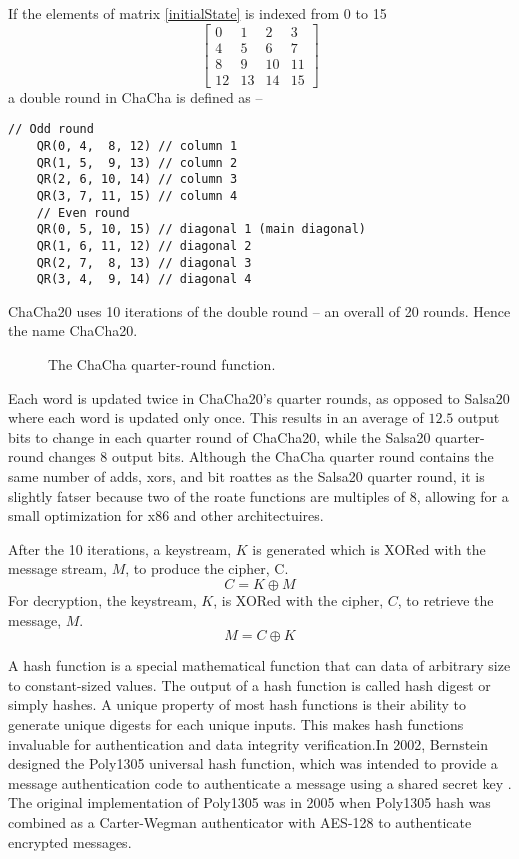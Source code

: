 \documentclass{article}
\begin{document}
If the elements of matrix \ref{initialState} is indexed from 0 to 15
\[\left[
        \begin{array}{cccc}
            0  & 1  & 2  & 3  \\
            4  & 5  & 6  & 7  \\
            8  & 9  & 10 & 11 \\
            12 & 13 & 14 & 15
        \end{array}
        \right]\]
a double round in ChaCha is defined as --
\begin{lstlisting}[basicstyle=\ttfamily,frame=none]
    // Odd round
    QR(0, 4,  8, 12) // column 1
    QR(1, 5,  9, 13) // column 2
    QR(2, 6, 10, 14) // column 3
    QR(3, 7, 11, 15) // column 4
    // Even round
    QR(0, 5, 10, 15) // diagonal 1 (main diagonal)
    QR(1, 6, 11, 12) // diagonal 2
    QR(2, 7,  8, 13) // diagonal 3
    QR(3, 4,  9, 14) // diagonal 4
\end{lstlisting}
ChaCha20 uses 10 iterations of the double round -- an overall of 20 rounds. Hence the name ChaCha20.

\begin{figure}[!h]
    \centering
    
    \caption{The ChaCha quarter-round function.}
\end{figure}

Each word is updated twice in ChaCha20's quarter rounds, as opposed to Salsa20 where each word is updated only once. This results in an average of $12.5$ output bits to change in each quarter round of ChaCha20, while the Salsa20 quarter-round changes 8 output bits. Although the ChaCha quarter round contains the same number of adds, xors, and bit roattes as the Salsa20 quarter round, it is slightly fatser because two of the roate functions are multiples of 8, allowing for a small optimization for x86 and other architectuires.

After the 10 iterations, a keystream, $K$ is generated which is XORed with the message stream, $M$, to produce the cipher, C.
\[C = K \oplus M\]
For decryption, the keystream, $K$, is XORed with the cipher, $C$, to retrieve the message, $M$.
\[M = C \oplus K\]


A hash function is a special mathematical function that can data of arbitrary size to constant-sized values. The output of a hash function is called hash digest or simply hashes. A unique property of most hash functions is their ability to generate unique digests for each unique inputs. This makes hash functions invaluable for authentication and data integrity verification.In 2002, Bernstein designed the Poly1305 universal hash function, which was intended to provide a message authentication code to authenticate a message using a shared secret key \cite{bernstein2005protecting}. The original implementation of Poly1305 was in 2005 when Poly1305 hash was combined as a Carter-Wegman authenticator \cite{carter1981new} with AES-128 to authenticate encrypted messages.
\end{document}
